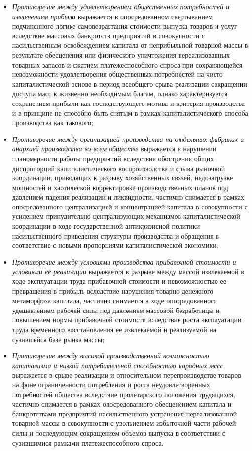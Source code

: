 \begin{itemize}
    \item \textit{Противоречие между удовлетворением общественных потребностей и извлечением прибыли} выражается в опосредованном свертыванием подчиненного логике самовозрастания стоимости выпуска товаров и услуг вследствие массовых банкротств предприятий в совокупности с насильственным освобождением капитала от неприбыльной товарной массы в результате обесценения или физического уничтожения нереализованных товарных запасов и сжатием платежеспособного спроса при сохраняющейся невозможности удовлетворения общественных потребностей на чисто капиталистической основе в период всеобщего срыва реализации сокращении доступа масс к жизненно необходимым благам, однако характеризуется сохранением прибыли как господствующего мотива и критерия производства и в принципе не способно быть снятым в рамках капиталистического способа производства как такового;
    \item \textit{Противоречие между организацией производства на отдельных фабриках и анархией производства во всем обществе} выражается в нарушении планомерности работы предприятий вследствие обострения общих диспропорций капиталистического воспроизводства и срыва рыночной координации, приводящих к разрыву хозяйственных связей, недозагрузке мощностей и хаотической корректировке производственных планов под давлением падения реализации и ликвидности, частично снимается в рамках опосредованного централизацией и концентрацией капитала в совокупности с усилением принудительно-централизующих механизмов капиталистической координации в ходе государственной антикризисной политики насильственного приведения структуры производства и обращения в соответствие с новыми пропорциями капиталистической экономики;
    \item \textit{Противоречие между условиями производства прибавочной стоимости и условиями ее реализации} выражается в разрыве между массой извлекаемой в ходе эксплуатации труда прибавочной стоимости и невозможностью ее превращения в прибыль вследствие нарушения товарно-денежного метаморфоза капитала, частично снимается в ходе опосредованного удешевлением рабочей силы под давлением массовой безработицы и повышением нормы прибавочной стоимости вследствие роста эксплуатации труда временного восстановления ее извлекаемой и реализуемой на сузившейся базе рынка массы;
    \item \textit{Противоречие между высокой производственной возможностью капитализма и низкой потребительной способностью народных масс} выражается в срыве реализации и относительном перепроизводстве товаров на фоне ограниченности потребления и роста неудовлетворенных потребностей общества вследствие пролетарского положения трудящихся, частично снимается в рамках опосредованного обесценением капитала и банкротствами предприятий насильственного устранения нереализованной товарной массы в совокупности с увольнением избыточной части рабочей силы и последующим сокращением объемов выпуска в соответствии с сузившимися рамками платежеспособного спроса.
\end{itemize}